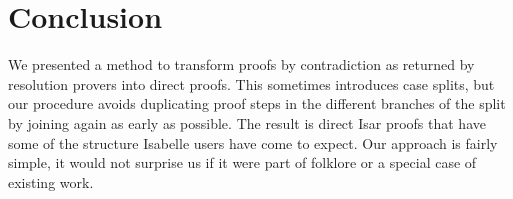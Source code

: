 \documentclass[withtimes,a4paper,12pt]{easychair}
\begin{document}
%
%
%
%
%
%
%
%
%
%
%
%

\section{Conclusion}
\label{sec:conclusion}

We presented a method to transform proofs by contradiction as returned by
resolution provers into direct proofs. This sometimes introduces case splits,
but our procedure avoids duplicating proof steps in the different branches of
the split by joining again as early as possible. The result is direct Isar
proofs that have some of the structure Isabelle users have come to expect. Our
approach is fairly simple, it would not surprise us if it were part of folklore
or a special case of existing work.
\end{document}
